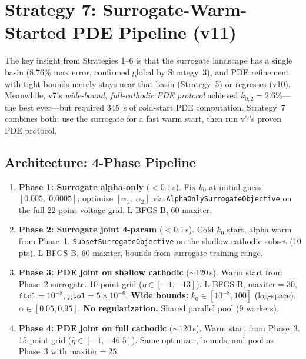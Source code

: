 \documentclass[11pt]{article}
\begin{document}
\section{Strategy 7: Surrogate-Warm-Started PDE Pipeline (v11)}

The key insight from Strategies 1--6 is that the surrogate landscape has a
single basin (8.76\% max error, confirmed global by Strategy~3), and PDE
refinement with tight bounds merely stays near that basin (Strategy~5) or
regresses (v10).  Meanwhile, v7's \emph{wide-bound, full-cathodic PDE protocol}
achieved $k_{0,2} = 2.6\%$---the best ever---but required \SI{345}{s} of
cold-start PDE computation.  Strategy~7 combines both: use the surrogate for a
fast warm start, then run v7's proven PDE protocol.

\subsection{Architecture: 4-Phase Pipeline}

\begin{enumerate}
  \item \textbf{Phase 1: Surrogate alpha-only} ($< 0.1$\,s).
        Fix $k_0$ at initial guess $[0.005,\; 0.0005]$; optimize
        $[\alpha_1,\; \alpha_2]$ via \texttt{AlphaOnlySurrogateObjective}
        on the full 22-point voltage grid.  L-BFGS-B, 60 maxiter.

  \item \textbf{Phase 2: Surrogate joint 4-param} ($< 0.1$\,s).
        Cold $k_0$ start, alpha warm from Phase~1.
        \texttt{SubsetSurrogateObjective} on the shallow cathodic subset
        (10 pts).  L-BFGS-B, 60 maxiter, bounds from surrogate training range.

  \item \textbf{Phase 3: PDE joint on shallow cathodic} (${\sim}120$\,s).
        Warm start from Phase~2 surrogate.  10-point grid
        ($\hat\eta \in [-1, -13]$).  L-BFGS-B, maxiter${}=30$,
        $\texttt{ftol} = 10^{-8}$, $\texttt{gtol} = 5 \times 10^{-6}$.
        \textbf{Wide bounds:} $k_0 \in [10^{-8}, 100]$ (log-space),
        $\alpha \in [0.05, 0.95]$.  \textbf{No regularization.}
        Shared parallel pool (9 workers).

  \item \textbf{Phase 4: PDE joint on full cathodic} (${\sim}120$\,s).
        Warm start from Phase~3.  15-point grid
        ($\hat\eta \in [-1, -46.5]$).  Same optimizer, bounds, and pool as Phase~3
        with maxiter${}=25$.
\end{enumerate}
\end{document}
